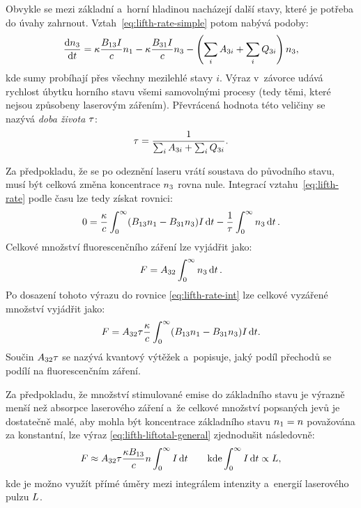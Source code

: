 Obvykle se mezi základní a~horní hladinou nacházejí další stavy,
které je potřeba do úvahy zahrnout.
Vztah~\eqref{eq:lifth-rate-simple} potom nabývá podoby:
\begin{equation}
	\label{eq:lifth-rate}
	\dv{n_3}{t}
	= \kappa \frac{B_{13} I}{c} n_1
	- \kappa \frac{B_{31} I}{c} n_3
	- \left( \sum_i A_{3i} + \sum_i Q_{3i} \right) n_3,
\end{equation}
kde sumy probíhají přes všechny mezilehlé stavy $i$.
Výraz v~závorce udává rychlost úbytku horního stavu všemi samovolnými
procesy (tedy těmi, které nejsou způsobeny laserovým zářením).
Převrácená hodnota této veličiny se nazývá \emph{doba života} $\tau$:
\begin{equation}
	\label{eq:lifth-lifetime-def}
	\tau = \frac{1}{\sum_i A_{3i} + \sum_i Q_{3i}}.
\end{equation}

Za předpokladu, že se po odeznění laseru vrátí soustava do původního stavu,
musí být celková změna koncentrace $n_3$ rovna nule.
Integrací vzta\-hu~\eqref{eq:lifth-rate} podle času lze tedy získat rovnici:
\begin{equation}
	\label{eq:lifth-rate-int}
	0 = \frac{\kappa}{c}
	\int_0^\infty (B_{13} n_1 - B_{31} n_3) I\,\dd t
	- \frac1{\tau} \int_0^\infty n_3 \dd{t}.
\end{equation}
Celkové množství fluorescenčního záření lze vyjádřit jako:
\begin{equation}
	\label{eq:lifth-liftotal-def}
	F = A_{32} \int_0^\infty n_3 \dd{t}.
\end{equation}
Po dosazení tohoto výrazu do rovnice \eqref{eq:lifth-rate-int}
lze celkové vyzářené množství vyjádřit jako:
\begin{equation}
	\label{eq:lifth-liftotal-general}
	F = A_{32} \tau \frac{\kappa}{c}
	\int_0^\infty
	(B_{13} n_1 - B_{31} n_3)
	I\,\dd t.
\end{equation}
Součin $A_{32} \tau$ se nazývá kvantový výtěžek a~popisuje,
jaký podíl přechodů se podílí na fluorescenčním záření.

Za předpokladu, že množství stimulované emise do základního stavu
je výrazně menší než absorpce laserového záření
a~že celkové množství popsaných jevů je dostatečně malé, aby mohla být
koncentrace základního stavu $n_1 = n$ považována za konstantní,
lze výraz \eqref{eq:lifth-liftotal-general} zjednodušit následovně:
\begin{equation}
	\label{eq:lifth-liftotal-linear}
	F \approx A_{32} \tau
	\frac{\kappa B_{13}}{c}
	n
	\int_0^\infty I\,\dd t
	\qquad
	\text{kde} \int_0^\infty I\,\dd t \propto L,
\end{equation}
kde je možno využít přímé úměry mezi integrálem intenzity
a~energií laserového pulzu $L$.


